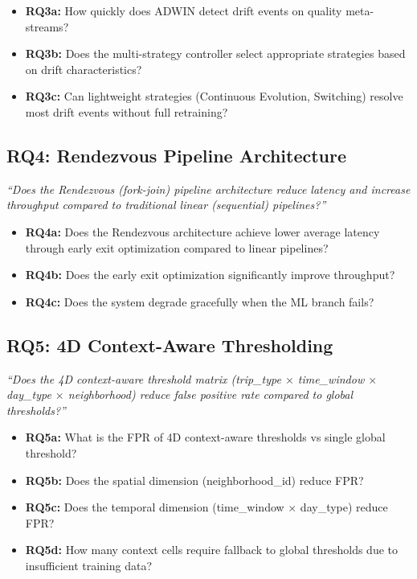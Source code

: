 \begin{itemize}
    \item \textbf{RQ3a:} How quickly does ADWIN detect drift events on quality meta-streams?
    \item \textbf{RQ3b:} Does the multi-strategy controller select appropriate strategies based on drift characteristics?
    \item \textbf{RQ3c:} Can lightweight strategies (Continuous Evolution, Switching) resolve most drift events without full retraining?
\end{itemize}

\subsection{RQ4: Rendezvous Pipeline Architecture}
\textit{``Does the Rendezvous (fork-join) pipeline architecture reduce latency and increase throughput compared to traditional linear (sequential) pipelines?''}

\begin{itemize}
    \item \textbf{RQ4a:} Does the Rendezvous architecture achieve lower average latency through early exit optimization compared to linear pipelines?
    \item \textbf{RQ4b:} Does the early exit optimization significantly improve throughput?
    \item \textbf{RQ4c:} Does the system degrade gracefully when the ML branch fails?
\end{itemize}

\subsection{RQ5: 4D Context-Aware Thresholding}
\textit{``Does the 4D context-aware threshold matrix (trip\_type $\times$ time\_window $\times$ day\_type $\times$ neighborhood) reduce false positive rate compared to global thresholds?''}

\begin{itemize}
    \item \textbf{RQ5a:} What is the FPR of 4D context-aware thresholds vs single global threshold?
    \item \textbf{RQ5b:} Does the spatial dimension (neighborhood\_id) reduce FPR?
    \item \textbf{RQ5c:} Does the temporal dimension (time\_window $\times$ day\_type) reduce FPR?
    \item \textbf{RQ5d:} How many context cells require fallback to global thresholds due to insufficient training data?
\end{itemize}

